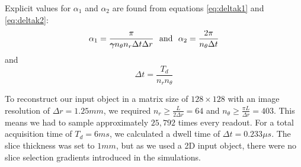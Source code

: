 \hfill

Explicit values for $\alpha_1$ and $\alpha_2$ are found from equations \ref{eq:deltak1} and \ref{eq:deltak2}:
\begin{equation}
    \alpha_1 = \frac{\pi}{\text{\sout{$\gamma$}} n_{\theta} n_r \Delta t \Delta r}  \, \, \text{  and  } \, \, \alpha_2 = \frac{2 \pi}{n_{\theta} \Delta t}
\end{equation}
and
\begin{equation}
    \Delta t = \frac{T_d}{n_r n_{\theta}}
\end{equation}

\hfill

To reconstruct our input object in a matrix size of $128 \times 128$ with an image resolution of $\Delta r = 1.25mm$,
we required $n_r \geq \frac{L}{2 \Delta r} = 64$ and
$n_{\theta} \geq \frac{\pi L}{\Delta r} = 403$.
This means we had to sample approximately $25,792$ times every readout.
For a total acquisition time of $T_d = 6ms$, we calculated a dwell time of $\Delta t = 0.233 \mu s$.
The slice thickness was set to $1mm$, but as we used a 2D input object, there were no slice selection gradients introduced in the simulations.

% 
% 

\hfill

